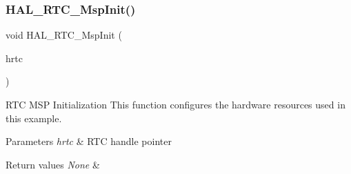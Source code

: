 \subsubsection{\texorpdfstring{H\+A\+L\+\_\+\+R\+T\+C\+\_\+\+Msp\+Init()}{HAL\_RTC\_MspInit()}}
{\footnotesize\ttfamily void H\+A\+L\+\_\+\+R\+T\+C\+\_\+\+Msp\+Init (\begin{DoxyParamCaption}\item[{\hyperlink{struct_r_t_c___handle_type_def}{R\+T\+C\+\_\+\+Handle\+Type\+Def} $\ast$}]{hrtc }\end{DoxyParamCaption})}



R\+TC M\+SP Initialization This function configures the hardware resources used in this example. 


\begin{DoxyParams}{Parameters}
{\em hrtc} & R\+TC handle pointer \\
\hline
\end{DoxyParams}

\begin{DoxyRetVals}{Return values}
{\em None} & \\
\hline
\end{DoxyRetVals}
